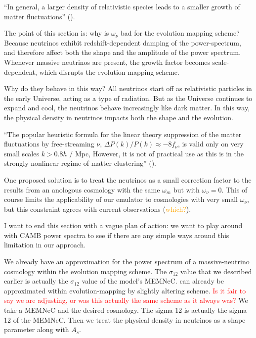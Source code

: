 ``In general, a larger density of relativistic species leads to a smaller
growth of matter fluctuations'' ().

The point of this section is: why is $\omega_\nu$ bad for the
evolution mapping scheme? Because neutrinos exhibit redshift-dependent
damping of the power-spectrum, and therefore affect both the shape and the
amplitude of the power spectrum. Whenever massive neutrinos are present,
the growth factor becomes scale-dependent, which disrupts the
evolution-mapping scheme.

Why do they behave in this way? All neutrinos start off as
relativistic particles in the early Universe, acting as a type of radiation.
But as the Universe continues to expand and cool, the neutrinos behave
increasingly like dark matter.
In this way, the physical density in neutrinos impacts both the shape and the
evolution.

``The popular heuristic formula for the linear theory suppression of the matter
fluctuations by free-streaming $\nu$, $\Delta P(k) / P(k) \approx -8 f_\nu$, is
valid only on very small scales $k > 0.8 h$ / Mpc, However, it is not of
practical use as this is in the strongly nonlinear regime of matter
clustering'' ().

One proposed solution is to treat the neutrinos as a small correction factor
to the results from an anologous cosmology with the same $\omega_m$ but with
$\omega_\nu = 0$. This of course limits the applicability of our emulator to
cosmologies with very small $\omega_\nu$, but this constraint agrees with
current observations (\textcolor{orange}{which?}).

I want to end this section with a vague plan of action: we want to play around with CAMB power spectra to see if there are any simple ways around this limitation in our approach.



We already have an approximation for the power spectrum of a massive-neutrino cosmology within the evolution mapping scheme. The $\sigma_{12}$ value that we described earlier is actually the $\sigma_{12}$ value of the model's MEMNeC. can already be approximated within evolution-mapping by slightly altering scheme. \textcolor{red}{Is it fair to say we are adjusting, or was this actually the same scheme as it always was?} We take a MEMNeC and the desired cosmology. The sigma 12 is actually the sigma 12 of the MEMNeC. Then we treat the physical density in neutrinos as a shape parameter along with $A_s$.
